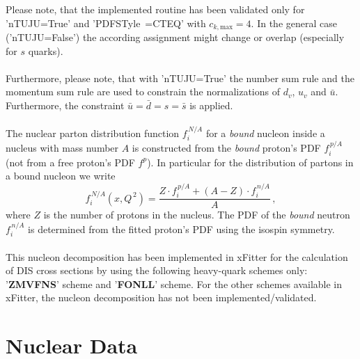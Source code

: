 \documentclass{article}
\begin{document}
\noindent Please note, that the implemented routine has been validated only for 'nTUJU=True' and '{PDFSTyle~=CTEQ}' with $c_{k,\mathrm{max}}=4$. In the general case ('nTUJU=False') the according assignment might change or overlap (especially for $s$ quarks).\\
\\
Furthermore, please note, that with 'nTUJU=True' the number sum rule and the momentum sum rule are used to constrain the normalizations of $d_v$, $u_v$ and $\bar{u}$. Furthermore, the constraint $\bar{u}=\bar{d}=s=\bar{s}$ is applied.\\
\\
The nuclear parton distribution function $f_i^{\,N/A}$ for a \textit{bound} nucleon inside a nucleus with mass number $A$ is constructed from the \textit{bound} proton's PDF $f_i^{\,p/A}$ (not from a free proton's PDF $f^p$). In particular for the distribution of partons in a bound nucleon we write
\begin{equation}
f_i^{\,N/A} \left( x,Q^{\,2} \right) = \frac{Z\cdot f_i^{\,p/A}+ (A-Z)\cdot f_i^{\,n/A}}{A}\,,
\label{eq:nucleon}
\end{equation} 
where $Z$ is the number of protons in the nucleus. The PDF of the \textit{bound} neutron~$f_i^{\,n/A}$ is determined from the fitted proton's PDF using the isospin symmetry.\\
\\
This nucleon decomposition has been implemented in xFitter for the calculation of DIS cross sections by using the following heavy-quark schemes only: '\textbf{ZMVFNS}' scheme and '\textbf{FONLL}' scheme. For the other schemes available in xFitter, the nucleon decomposition has not been implemented/validated.

\section{Nuclear Data}
\label{sec-nucldata}
\end{document}
